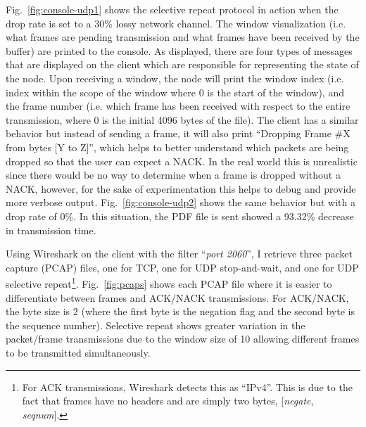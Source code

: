 \documentclass[runningheads]{llncs}
\begin{document}
Fig.~\ref{fig:console-udp1} shows the selective repeat protocol in action when the drop rate is set to a 30\% lossy network channel. The window visualization (i.e. what frames are pending transmission and what frames have been received by the buffer) are printed to the console. As displayed, there are four types of messages that are displayed on the client which are responsible for representing the state of the node. Upon receiving a window, the node will print the window index (i.e. index within the scope of the window where 0 is the start of the window), and the frame number (i.e. which frame has been received with respect to the entire transmission, where 0 is the initial 4096 bytes of the file). The client has a similar behavior but instead of sending a frame, it will also print ``Dropping Frame #X from bytes [Y to Z]'', which helps to better understand which packets are being dropped so that the user can expect a NACK. In the real world this is unrealistic since there would be no way to determine when a frame is dropped without a NACK, however, for the sake of experimentation this helps to debug and provide more verbose output. Fig.~\ref{fig:console-udp2} shows the same behavior but with a drop rate of 0\%. In this situation, the PDF file is sent showed a 93.32\% decrease in transmission time.

Using Wireshark on the client with the filter ``\emph{port 2060}'', I retrieve three packet capture (PCAP) files, one for TCP, one for UDP stop-and-wait, and one for UDP selective repeat\footnote{For ACK transmissions, Wireshark detects this as ``IPv4''. This is due to the fact that frames have no headers and are simply two bytes, [\emph{negate}, \emph{seqnum}].}. Fig.~\ref{fig:pcaps} shows each PCAP file where it is easier to differentiate between frames and ACK/NACK transmissions. For ACK/NACK, the byte size is 2 (where the first byte is the negation flag and the second byte is the sequence number). Selective repeat shows greater variation in the packet/frame transmissions due to the window size of 10 allowing different frames to be transmitted simultaneously.





\nocite{*}
\footnotesize
%
%
\end{document}
